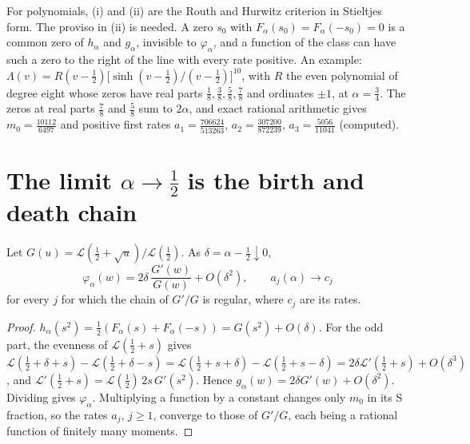 \begin{remark}\label{h:rem:proviso}
For polynomials, (i) and (ii) are the Routh and Hurwitz criterion in Stieltjes form. The proviso in (ii) is needed. A zero $s_0$ with $F_\alpha(s_0)=F_\alpha(-s_0)=0$ is a common zero of $h_\alpha$ and $g_\alpha$, invisible to $\varphi_\alpha$, and a function of the class can have such a zero to the right of the line with every rate positive. An example: $\Lambda(v)=R(v-\frac12)\bigl[\sinh(v-\frac12)/(v-\frac12)\bigr]^{10}$, with $R$ the even polynomial of degree eight whose zeros have real parts $\frac18,\frac38,\frac58,\frac78$ and ordinates $\pm1$, at $\alpha=\frac34$. The zeros at real parts $\frac78$ and $\frac58$ sum to $2\alpha$, and exact rational arithmetic gives $m_0=\frac{10112}{6497}$ and positive first rates $a_1=\frac{706624}{513263}$, $a_2=\frac{307200}{872239}$, $a_3=\frac{5056}{11041}$ (computed). %
\end{remark}

\section{The limit $\alpha\to\frac12$ is the birth and death chain}

\begin{theorem}[Limit]\label{h:thm:limit}
Let $G(u)=\mathcal L(\frac12+\sqrt u)/\mathcal L(\frac12)$. As $\delta=\alpha-\frac12\downarrow0$,
\[
\varphi_\alpha(w)=2\delta\,\frac{G'(w)}{G(w)}+O(\delta^2),\qquad a_j(\alpha)\to c_j
\]
for every $j$ for which the chain of $G'/G$ is regular, where $c_j$ are its rates.
\end{theorem}

\begin{proof}
$h_\alpha(s^2)=\frac12(F_\alpha(s)+F_\alpha(-s))=G(s^2)+O(\delta)$. For the odd part, the evenness of $\mathcal L(\frac12+s)$ gives $\mathcal L(\frac12+\delta+s)-\mathcal L(\frac12+\delta-s)=\mathcal L(\frac12+s+\delta)-\mathcal L(\frac12+s-\delta)=2\delta\mathcal L'(\frac12+s)+O(\delta^3)$, and $\mathcal L'(\frac12+s)=\mathcal L(\frac12)\,2s\,G'(s^2)$. Hence $g_\alpha(w)=2\delta G'(w)+O(\delta^2)$. Dividing gives $\varphi_\alpha$. Multiplying a function by a constant changes only $m_0$ in its S fraction, so the rates $a_j$, $j\ge1$, converge to those of $G'/G$, each being a rational function of finitely many moments.
\end{proof}

